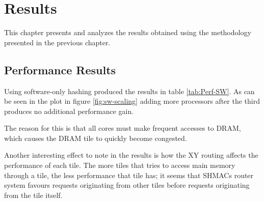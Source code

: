 \chapter{Results}

This chapter presents and analyzes the results obtained using the methodology
presented in the previous chapter.

\section{Performance Results}

Using software-only hashing produced the results in table \ref{tab:Perf-SW}. As can be seen
in the plot in figure \ref{fig:sw-scaling} adding more processors after the third produces no
additional performance gain.

The reason for this is that all cores must make frequent accesses to DRAM, which causes the
DRAM tile to quickly become congested.

Another interesting effect to note in the results is how the XY routing affects the performance
of each tile. The more tiles that tries to access main memory through a tile, the less
performance that tile has; it seems that SHMACs router system favours requests originating
from other tiles before requests originating from the tile itself.


